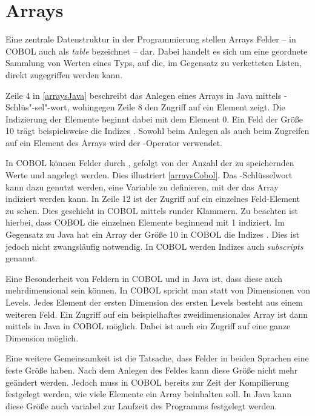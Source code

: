 \section{Arrays}\label{sec:felder}
Eine zentrale Datenstruktur in der Programmierung stellen Arrays \bzw Felder -- in COBOL auch als \textit{table} bezeichnet -- dar. Dabei handelt es sich um eine geordnete Sammlung von Werten eines Typs, auf die, im Gegensatz zu \zB verketteten Listen, direkt zugegriffen werden kann. 

Zeile 4 in \autoref{arraysJava} beschreibt das Anlegen eines Arrays in Java mittels -Schlüs"-sel"-wort, wohingegen Zeile 8 den Zugriff auf ein Element zeigt. Die Indizierung der Elemente beginnt dabei mit dem Element 0. Ein Feld der Größe 10 trägt beispielsweise die Indizes . Sowohl beim Anlegen als auch beim Zugreifen auf ein Element des Arrays wird der \jav{[]}-Operator verwendet.

In COBOL können Felder durch , gefolgt von der Anzahl der zu speichernden Werte und  angelegt werden. Dies illustriert \autoref{arraysCobol}. Das -Schlüsselwort kann dazu genutzt werden, eine Variable zu definieren, mit der das Array indiziert werden kann. In Zeile 12 ist der Zugriff auf ein einzelnes Feld-Element zu sehen. Dies geschieht in COBOL mittels runder Klammern. Zu beachten ist hierbei, dass COBOL die einzelnen Elemente beginnend mit 1 indiziert. Im Gegensatz zu Java hat ein Array der Größe 10 in COBOL die Indizes . Dies ist jedoch nicht zwangsläufig notwendig. In COBOL werden Indizes auch \textit{subscripts} genannt.


Eine Besonderheit von Feldern in COBOL und in Java ist, dass diese auch mehrdimensional sein können. In COBOL spricht man statt von Dimensionen von Levels. Jedes Element der ersten Dimension \bzw des ersten Levels besteht aus einem weiteren Feld. Ein Zugriff auf ein beispielhaftes zweidimensionales Array ist dann mittels \jav{[][]} in Java \bzw {} in COBOL möglich. Dabei ist auch ein Zugriff auf eine ganze Dimension möglich.

Eine weitere Gemeinsamkeit ist die Tatsache, dass Felder in beiden Sprachen eine feste Größe haben. Nach dem Anlegen des Feldes kann diese Größe nicht mehr geändert werden. Jedoch muss in COBOL bereits zur Zeit der Kompilierung festgelegt werden, wie viele Elemente ein Array beinhalten soll. In Java kann diese Größe auch variabel zur Laufzeit des Programms festgelegt werden.
